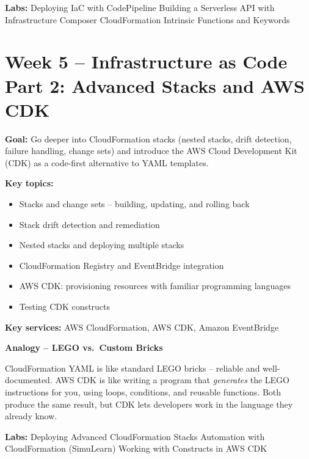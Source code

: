 \documentclass[12pt,a4paper]{article}
\begin{document}
\textbf{Labs:} Deploying IaC with CodePipeline \textbullet{}
Building a Serverless API with Infrastructure Composer \textbullet{}
CloudFormation Intrinsic Functions and Keywords

\newpage

\section{Week 5 -- Infrastructure as Code Part 2: Advanced Stacks and AWS CDK}

\textbf{Goal:} Go deeper into CloudFormation stacks (nested stacks, drift detection,
failure handling, change sets) and introduce the AWS Cloud Development Kit (CDK) as a
code-first alternative to YAML templates.

\textbf{Key topics:}
\begin{itemize}[leftmargin=1.5em]
  \item Stacks and change sets -- building, updating, and rolling back
  \item Stack drift detection and remediation
  \item Nested stacks and deploying multiple stacks
  \item CloudFormation Registry and EventBridge integration
  \item AWS CDK: provisioning resources with familiar programming languages
  \item Testing CDK constructs
\end{itemize}

\textbf{Key services:} AWS CloudFormation, AWS CDK, Amazon EventBridge

\begin{analogybox}
\textbf{Analogy -- LEGO vs.\ Custom Bricks}

CloudFormation YAML is like standard LEGO bricks -- reliable and well-documented.
AWS CDK is like writing a program that \emph{generates} the LEGO instructions for
you, using loops, conditions, and reusable functions. Both produce the same result,
but CDK lets developers work in the language they already know.
\end{analogybox}

\textbf{Labs:} Deploying Advanced CloudFormation Stacks \textbullet{}
Automation with CloudFormation (SimuLearn) \textbullet{}
Working with Constructs in AWS CDK

\newpage
\end{document}
